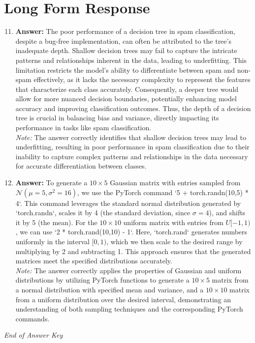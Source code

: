 \documentclass[12pt]{article}
\begin{document}
\section*{Long Form Response}
\begin{enumerate}[label=\arabic*.]
\setcounter{enumi}{10}
\item \textbf{Answer:} The poor performance of a decision tree in spam classification, despite a bug-free implementation, can often be attributed to the tree's inadequate depth. Shallow decision trees may fail to capture the intricate patterns and relationships inherent in the data, leading to underfitting. This limitation restricts the model's ability to differentiate between spam and non-spam effectively, as it lacks the necessary complexity to represent the features that characterize each class accurately. Consequently, a deeper tree would allow for more nuanced decision boundaries, potentially enhancing model accuracy and improving classification outcomes. Thus, the depth of a decision tree is crucial in balancing bias and variance, directly impacting its performance in tasks like spam classification.
\\ \textit{Note:} The answer correctly identifies that shallow decision trees may lead to underfitting, resulting in poor performance in spam classification due to their inability to capture complex patterns and relationships in the data necessary for accurate differentiation between classes.
\item \textbf{Answer:} To generate a $10\times 5$ Gaussian matrix with entries sampled from $\mathcal{N}(\mu=5,\sigma^2=16)$, we use the PyTorch command `5 + torch.randn(10,5) * 4`. This command leverages the standard normal distribution generated by `torch.randn`, scales it by 4 (the standard deviation, since $\sigma = 4$), and shifts it by 5 (the mean). For the $10\times 10$ uniform matrix with entries from $U[-1,1)$, we can use `2 * torch.rand(10,10) - 1`. Here, `torch.rand` generates numbers uniformly in the interval $[0,1)$, which we then scale to the desired range by multiplying by 2 and subtracting 1. This approach ensures that the generated matrices meet the specified distributions accurately.
\\ \textit{Note:} The answer correctly applies the properties of Gaussian and uniform distributions by utilizing PyTorch functions to generate a $10\times 5$ matrix from a normal distribution with specified mean and variance, and a $10\times 10$ matrix from a uniform distribution over the desired interval, demonstrating an understanding of both sampling techniques and the corresponding PyTorch commands.
\end{enumerate}

\vfill
\noindent\textit{End of Answer Key}
\end{document}
